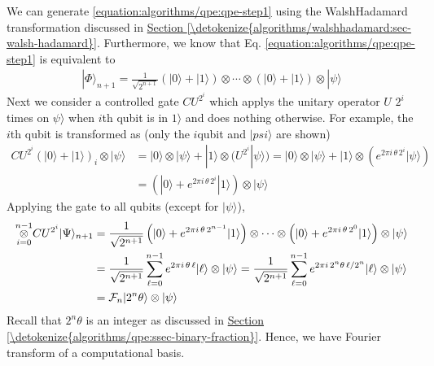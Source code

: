 \documentclass[letterpaper,10pt,english]{jupyterBook}
\begin{document}
\sphinxAtStartPar
We can generate \eqref{equation:algorithms/qpe:qpe-step1} using the Walsh\sphinxhyphen{}Hadamard transformation discussed in \hyperref[\detokenize{algorithms/walshhadamard:sec-walsh-hadamard}]{Section \ref{\detokenize{algorithms/walshhadamard:sec-walsh-hadamard}}}.  Furthermore, we know that Eq. \eqref{equation:algorithms/qpe:qpe-step1} is equivalent to
\begin{equation*}
\begin{split}
|\Phi\rangle_{n+1} = \frac{1}{\sqrt{2^{n+1}}} \left(|0\rangle + |1\rangle\right) \otimes \cdots \otimes \left(|0\rangle + |1\rangle\right) \otimes |\psi\rangle
\end{split}
\end{equation*}
\sphinxAtStartPar
Next we consider a controlled gate \(CU^{2^i}\) which applys the unitary operator \(U\) \(2^i\) times on \(\psi\rangle\) when \(i\)\sphinxhyphen{}th qubit is in \(1\rangle\) and does nothing otherwise.  For example, the \(i\)\sphinxhyphen{}th qubit is transformed as (only the \(i\)\sphinxhyphen{}qubit and \(|psi\rangle\) are shown)
\begin{align}
CU^{2^i} \left(|0\rangle + |1\rangle\right)_i \otimes |\psi\rangle &=
|0\rangle \otimes |\psi\rangle + |1\rangle \otimes (U^{2^i}|\psi\rangle)
= |0\rangle \otimes |\psi\rangle + |1\rangle \otimes (e^{2\pi i\, \theta\, 2^i} |\psi\rangle) \\
&= \left(|0\rangle + e^{2\pi i\, \theta\, 2^i} |1\rangle\right) \otimes |\psi\rangle
\end{align}
\sphinxAtStartPar
Applying the gate to all qubits (except for \(|\psi\rangle\)),
\begin{align}
\overset{n-1}{\underset{i=0}{\Large\otimes}} CU^{2^i} |\Psi\rangle_{n+1}
&= \frac{1}{\sqrt{2^{n+1}}} \left(|0\rangle + e^{2\pi i\, \theta\,2^{n-1}}|1\rangle\right) \otimes \cdots \otimes \left(|0\rangle + e^{2\pi i\, \theta\,2^{0}}|1\rangle\right) \otimes |\psi\rangle \\
& =  \frac{1}{\sqrt{2^{n+1}}} \sum_{\ell=0}^{n-1} e^{2\pi i\, \theta\, \ell} |\ell\rangle \otimes |\psi\rangle =  \frac{1}{\sqrt{2^{n+1}}} \sum_{\ell=0}^{n-1} e^{2\pi i\, 2^n \theta\, \ell/2^n} |\ell\rangle \otimes |\psi\rangle \\
&= \mathcal{F}_{n} |2^n \theta\rangle \otimes |\psi\rangle
\end{align}
\sphinxAtStartPar
Recall that \(2^n \theta\) is an integer as discussed in \hyperref[\detokenize{algorithms/qpe:ssec-binary-fraction}]{Section \ref{\detokenize{algorithms/qpe:ssec-binary-fraction}}}.  Hence, we have Fourier transform of a computational basis.
\end{document}
